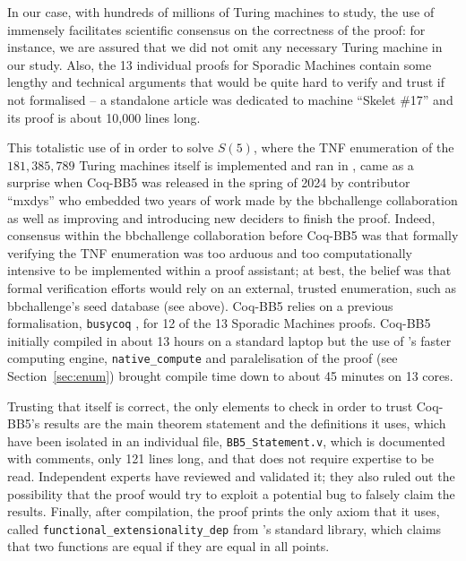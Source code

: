 \documentclass[a4paper,british]{article}
\theoremstyle{definition} %
\numberwithin{equation}{section}
\theoremstyle{definition} %
\newcommand{\BBtheFifthTNF}{181{,}385{,}789}
\newcommand{\CoqBB}{Coq-BB5\xspace}
\begin{document}
In our case, with hundreds of millions of Turing machines to study, the use of \Coq immensely facilitates scientific consensus on the correctness of the proof: for instance, we are assured that we did not omit any necessary Turing machine in our study. Also, the 13 individual proofs for Sporadic Machines contain some lengthy and technical arguments that would be quite hard to verify and trust if not formalised -- \eg a standalone article was dedicated to machine ``Skelet \#17'' \cite{xu2024skelet17fifthbusy} and its \Coq proof is about 10,000 lines long.

This totalistic use of \Coq in order to solve $S(5)$, where the TNF enumeration of the $\BBtheFifthTNF$ Turing machines itself is implemented and ran in \Coq, came as a surprise when \CoqBB was released in the spring of 2024 by contributor ``mxdys'' who embedded two years of work made by the bbchallenge collaboration as well as improving and introducing new deciders to finish the proof. Indeed, consensus within the bbchallenge collaboration before \CoqBB was that formally verifying the TNF enumeration was too arduous and too computationally intensive to be implemented within a proof assistant; at best, the belief was that formal verification efforts would rely on an external, trusted enumeration, such as bbchallenge's seed database (see above). \CoqBB relies on a previous formalisation, \texttt{busycoq} \cite{busycoq}, for 12 of the 13 Sporadic Machines \Coq proofs. \CoqBB initially compiled in about 13 hours on a standard laptop but the use of \Coq's faster computing engine, \texttt{native\_compute} \cite{nativecompute} and paralelisation of the proof (see Section~\ref{sec:enum}) brought compile time down to about 45 minutes on 13 cores.

Trusting that \Coq itself is correct, the only elements to check in order to trust \CoqBB's results are the main theorem statement and the definitions it uses, which have been isolated in an individual file, \texttt{BB5\_Statement.v}, which is documented with comments, only 121 lines long, and that does not require \Coq expertise to be read. Independent \Coq experts have reviewed and validated it; they also ruled out the possibility that the proof would try to exploit a potential \Coq bug to falsely claim the results. Finally, after compilation, the proof prints the only axiom that it uses, called \texttt{functional\_extensionality\_dep} from \Coq's standard library, which claims that two functions are equal if they are equal in all points.

\end{document}
